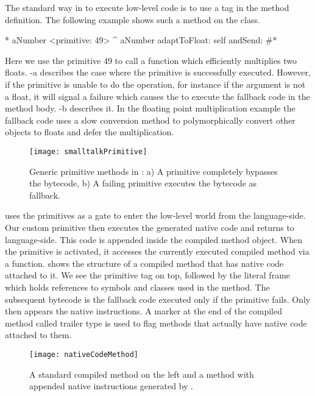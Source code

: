 
The standard way in \PH to execute low-level code is to use a tag in the method definition. The following example shows such a method on the  class.
%
\begin{stcode}[label={lst:benzo-basic-primitive}]{5}
* aNumber 
	<primitive: 49>
	^ aNumber adaptToFloat: self andSend: #*
\end{stcode}
%
Here we use the primitive 49 to call a \VM function which efficiently multiplies two floats. 
-a describes the case where the primitive is successfully executed.
However, if the primitive is unable to do the operation, for instance if the argument  is not a float, it will signal a failure which causes the \VM to execute the fallback \PH code in the method body.  
-b describes it. 
In the floating point multiplication example the fallback code uses a slow conversion method to polymorphically convert other objects to floats and defer the multiplication.


\begin{figure}[ht]
	\centering
	\texttt{[image: smalltalkPrimitive]}
	\caption[\PH Primitive]{Generic primitive methods in \PH: a) A primitive completely bypasses the bytecode, b) A failing primitive executes the bytecode as fallback.}
\end{figure}

\noindent \B uses the primitives as a gate to enter the low-level world from the language-side.
Our custom primitive then executes the generated native code and returns to language-side. 
This code is appended inside the compiled method object.
When the primitive is activated, it  accesses the currently executed compiled method via a \VM function. 
 shows the structure of a \PH compiled method that has native code attached to it.
We see the primitive tag on top, followed by the literal frame which holds references to symbols and classes used in the method.
The subsequent \PH bytecode is the fallback code executed only if the primitive fails. Only then appears the native instructions.
A marker at the end of the compiled method called trailer type is used to flag methods that actually have native code attached to them.
%
\begin{figure}[ht]
	\centering
	\texttt{[image: nativeCodeMethod]}
	\caption[\PH Compiled Method]{A standard \PH compiled method on the left and a method with appended native instructions generated by \B.}
\end{figure}

